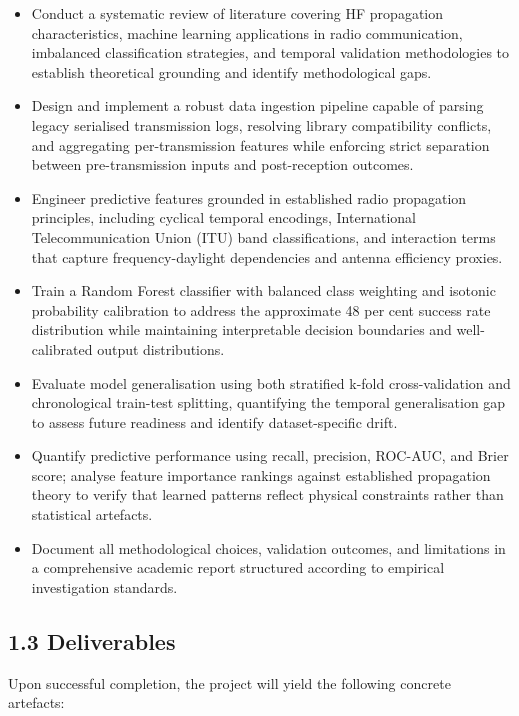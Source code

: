 \begin{itemize}
\tightlist
\item
  Conduct a systematic review of literature covering HF propagation
  characteristics, machine learning applications in radio communication,
  imbalanced classification strategies, and temporal validation
  methodologies to establish theoretical grounding and identify
  methodological gaps.
\item
  Design and implement a robust data ingestion pipeline capable of
  parsing legacy serialised transmission logs, resolving library
  compatibility conflicts, and aggregating per-transmission features
  while enforcing strict separation between pre-transmission inputs and
  post-reception outcomes.
\item
  Engineer predictive features grounded in established radio propagation
  principles, including cyclical temporal encodings, International
  Telecommunication Union (ITU) band classifications, and interaction
  terms that capture frequency-daylight dependencies and antenna
  efficiency proxies.
\item
  Train a Random Forest classifier with balanced class weighting and
  isotonic probability calibration to address the approximate 48 per
  cent success rate distribution while maintaining interpretable
  decision boundaries and well-calibrated output distributions.
\item
  Evaluate model generalisation using both stratified k-fold
  cross-validation and chronological train-test splitting, quantifying
  the temporal generalisation gap to assess future readiness and
  identify dataset-specific drift.
\item
  Quantify predictive performance using recall, precision, ROC-AUC, and
  Brier score; analyse feature importance rankings against established
  propagation theory to verify that learned patterns reflect physical
  constraints rather than statistical artefacts.
\item
  Document all methodological choices, validation outcomes, and
  limitations in a comprehensive academic report structured according to
  empirical investigation standards.
\end{itemize}

\subsection{1.3 Deliverables}\label{deliverables}

Upon successful completion, the project will yield the following
concrete artefacts:

